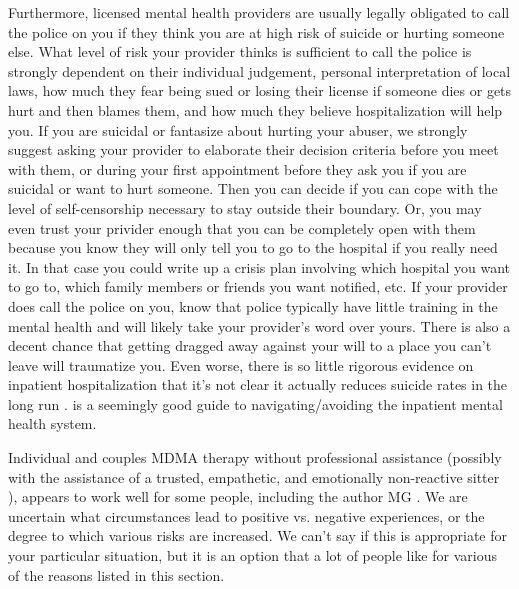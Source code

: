 \documentclass[12pt,letterpaper]{book}
\begin{document}
Furthermore, licensed mental health providers are usually legally obligated to call the police on you if they think you are at high risk of suicide or hurting someone else. What level of risk your provider thinks is sufficient to call the police is strongly dependent on their individual judgement, personal interpretation of local laws, how much they fear being sued or losing their license if someone dies or gets hurt and then blames them, and how much they believe hospitalization will help you. If you are suicidal or fantasize about hurting your abuser, we strongly suggest asking your provider to elaborate their decision criteria before you meet with them, or during your first appointment before they ask you if you are suicidal or want to hurt someone. Then you can decide if you can cope with the level of self-censorship necessary to stay outside their boundary. Or, you may even trust your privider enough that you can be completely open with them because you know they will only tell you to go to the hospital if you really need it. In that case you could write up a crisis plan involving which hospital you want to go to, which family members or friends you want notified, etc. If your provider does call the police on you, know that police typically have little training in the mental health and will likely take your provider's word over yours. There is also a decent chance that getting dragged away against your will to a place you can't leave will traumatize you. Even worse, there is so little rigorous evidence on inpatient hospitalization that it's not clear it actually reduces suicide rates in the long run \cite{borecky2019reweighing}. \textcite{alexanderInpatient} is a seemingly good guide to navigating/avoiding the inpatient mental health system.

Individual and couples MDMA therapy without professional assistance (possibly with the assistance of a trusted, empathetic, and emotionally non-reactive sitter \cite{thalSitter}), appears to work well for some people, including the author MG \cite{hillsSolo,colbertEvenings}. We are uncertain what circumstances lead to positive vs. negative experiences, or the degree to which various risks are increased. We can't say if this is appropriate for your particular situation, but it is an option that a lot of people like for various of the reasons listed in this section.
\end{document}
